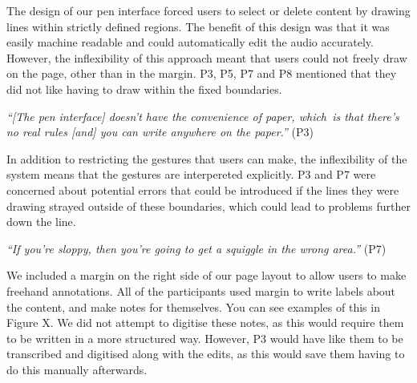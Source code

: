 
The design of our pen interface forced users to select or delete content by drawing lines within strictly defined
regions. The benefit of this design was that it was easily machine readable and could automatically edit the audio
accurately. However, the inflexibility of this approach meant that users could not freely draw on the page, other than
in the margin. P3, P5, P7 and P8 mentioned that they did not like having to draw within the fixed boundaries.

\textit{``[The pen interface] doesn't have the convenience of paper, which is that there's no real rules [and] you can
write anywhere on the paper.''} (P3)

In addition to restricting the gestures that users can make, the inflexibility of the system means that the gestures
are interpereted explicitly. P3 and P7 were concerned about potential errors that could be introduced if the lines they
were drawing strayed outside of these boundaries, which could lead to problems further down the line.

\textit{``If you're sloppy, then you're going to get a squiggle in the wrong area.''} (P7)



We included a margin on the right side of our page layout to allow users to make freehand annotations. All of the
participants used margin to write labels about the content, and make notes for themselves. You can see examples of this
in Figure X. We did not attempt to digitise these notes, as this would require them to be written in a more structured
way. However, P3 would have like them to be transcribed and digitised along with the edits, as this would save them
having to do this manually afterwards.




